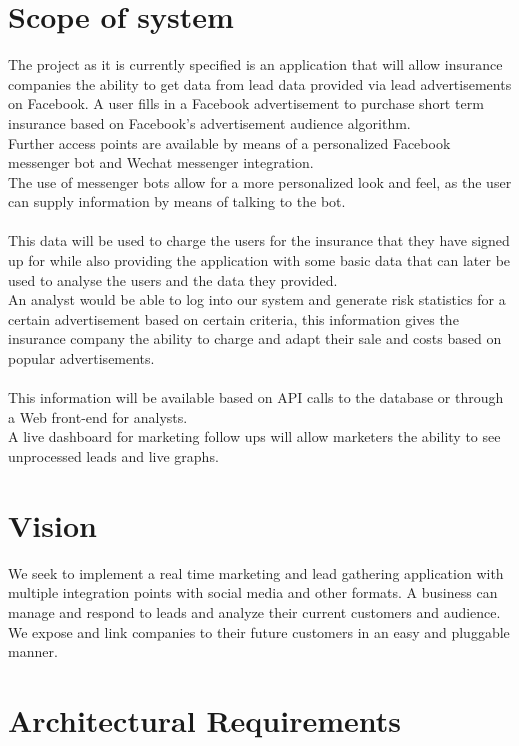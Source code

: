 \documentclass{article}
\begin{document}
\section{Scope of system}
The project as it is currently specified is an application that will allow insurance companies the ability to get data from lead data provided via lead advertisements on Facebook.
A user fills in a Facebook advertisement to purchase short term insurance based on Facebook's advertisement audience algorithm. \\
Further access points are available by means of a personalized Facebook messenger bot and Wechat messenger integration.\\ The use of messenger bots allow for a more personalized look and feel, as the user can supply information by means of talking to the bot. \\ \\
This data will be used to charge the users for the insurance that they have signed up for while also providing the application with some basic data that can later be used to analyse the users and the data they provided. \\
An analyst would be able to log into our system and generate risk statistics for a certain advertisement based on certain criteria, this information gives the insurance company the ability to charge and adapt their sale and costs based on popular advertisements.\\ \\
This information will be available based on API calls to the database or through a Web front-end for analysts.\\
A live dashboard for marketing follow ups will allow marketers the ability to see unprocessed leads and live graphs.


\section{Vision}
We seek to implement a real time marketing and lead gathering application with multiple integration points with social media and other formats. 
A business can manage and respond to leads and analyze their current customers and audience. 
We expose and link companies to their future customers in an easy and pluggable manner.

\pagebreak

\section{Architectural Requirements}
\end{document}
